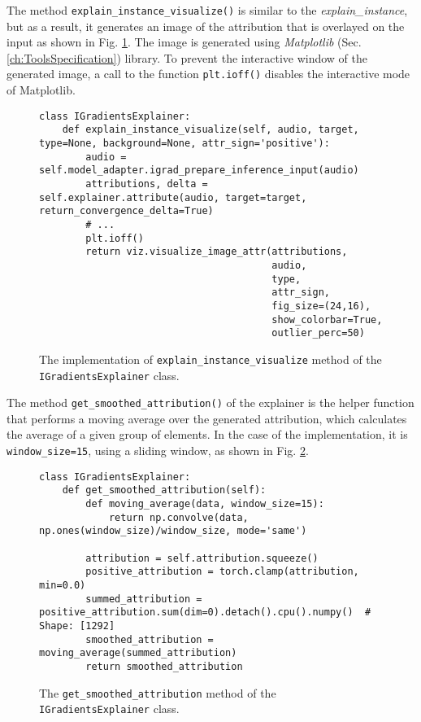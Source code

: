 \documentclass[
    bindingoffset=5mm,  %
    footnoteindent=3mm, %
    hyphenation=true    %
]{src/wut-thesis}
\begin{document}
The method \texttt{explain_instance_visualize()} is similar to the \emph{explain\_instance}, 
but as a result, it generates an image of the attribution that is overlayed on the
input as shown in Fig. \ref{fig:ExplainInstanceVisualize}.
The image is generated using \emph{Matplotlib} (Sec. \ref{ch:ToolsSpecification}) library.
To prevent the interactive window of the generated image, a call to the function \texttt{plt.ioff()}
disables the interactive mode of Matplotlib.

\begin{figure}[h!]
\begin{verbatim}
class IGradientsExplainer:
    def explain_instance_visualize(self, audio, target, type=None, background=None, attr_sign='positive'):
        audio = self.model_adapter.igrad_prepare_inference_input(audio)
        attributions, delta = self.explainer.attribute(audio, target=target, return_convergence_delta=True)
        # ...
        plt.ioff()
        return viz.visualize_image_attr(attributions,
                                        audio,
                                        type,
                                        attr_sign,
                                        fig_size=(24,16),
                                        show_colorbar=True,
                                        outlier_perc=50)
\end{verbatim}
\caption{The implementation of \texttt{explain\_instance\_visualize} method of the \texttt{IGradientsExplainer} class.}
\label{fig:ExplainInstanceVisualize}
\end{figure}

The method \texttt{get_smoothed_attribution()} of the explainer is the helper
function that performs a moving average over the generated attribution, which calculates
the average of a given group of elements. In the case of the implementation,
it is \texttt{window_size=15}, using a sliding window, as shown in Fig. \ref{fig:get_smoothed_attribution}.

\begin{figure}[h!]
\begin{verbatim}
class IGradientsExplainer:
    def get_smoothed_attribution(self):
        def moving_average(data, window_size=15):
            return np.convolve(data, np.ones(window_size)/window_size, mode='same')

        attribution = self.attribution.squeeze()
        positive_attribution = torch.clamp(attribution, min=0.0)
        summed_attribution = positive_attribution.sum(dim=0).detach().cpu().numpy()  # Shape: [1292]
        smoothed_attribution = moving_average(summed_attribution)
        return smoothed_attribution
\end{verbatim}
\caption{The \texttt{get\_smoothed\_attribution} method of the \texttt{IGradientsExplainer} class.}
\label{fig:get_smoothed_attribution}
\end{figure}
\end{document}
